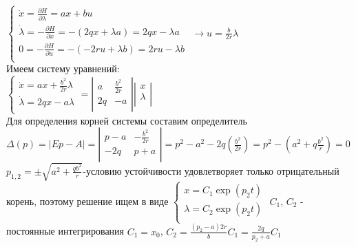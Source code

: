 \documentclass[preprint,russian,a5paper,10pt,twoside,mediummath]{ncc}
\begin{document}
\\$\left\{ \begin{array}{*{35}{l}}
   \dot{x}=\frac{\partial H}{\partial \lambda }=ax+bu  \\
   \dot{\lambda }=-\frac{\partial H}{\partial x}=-\left( 2qx+\lambda a \right)=2qx-\lambda a  \\
   0=-\frac{\partial H}{\partial u}=-\left( -2ru+\lambda b \right)=2ru-\lambda b  \\
\end{array} \right.$ $\to u=\frac{b}{2r}\lambda $
\\Имеем систему уравнений:
\\$\left\{ \begin{array}{*{35}{l}}
   \dot{x}=ax+\frac{{{b}^{2}}}{2r}\lambda   \\
   \dot{\lambda }=2qx-a\lambda   \\
\end{array} \right.=\left| \begin{matrix}
   a & \frac{{{b}^{2}}}{2r}  \\
   2q & -a  \\
\end{matrix} \right|\left| \begin{matrix}
   x  \\
   \lambda   \\
\end{matrix} \right|$
\\Для определения корней системы составим определитель
\\$\Delta \left( p \right)=\left| Ep-A \right|=\left| \begin{matrix}
   p-a & -\frac{{{b}^{2}}}{2r}  \\
   -2q & p+a  \\
\end{matrix} \right|={{p}^{2}}-{{a}^{2}}-2q\left( \frac{{{b}^{2}}}{2r} \right)={{p}^{2}}-\left( {{a}^{2}}+q\frac{{{b}^{2}}}{r} \right)=0$
\\${{p}_{1,2}}=\pm \sqrt{{{a}^{2}}+\frac{q{{b}^{2}}}{r}}$-условию устойчивости удовлетворяет только отрицательный корень, поэтому решение ищем в виде $\left\{ \begin{array}{*{35}{l}}
   x={{C}_{1}}\exp \left( {{p}_{2}}t \right)  \\
   \lambda ={{C}_{2}}\exp \left( {{p}_{2}}t \right)  \\
\end{array} \right.$ ${{C}_{1}},\,{{C}_{2}}$ - постоянные интегрирования ${{C}_{1}}={{x}_{0}}$, ${{C}_{2}}=\frac{\left( {{p}_{2}}-a \right)2r}{b}{{C}_{1}}=\frac{2q}{{{p}_{2}}+a}{{C}_{1}}$
\end{document}
